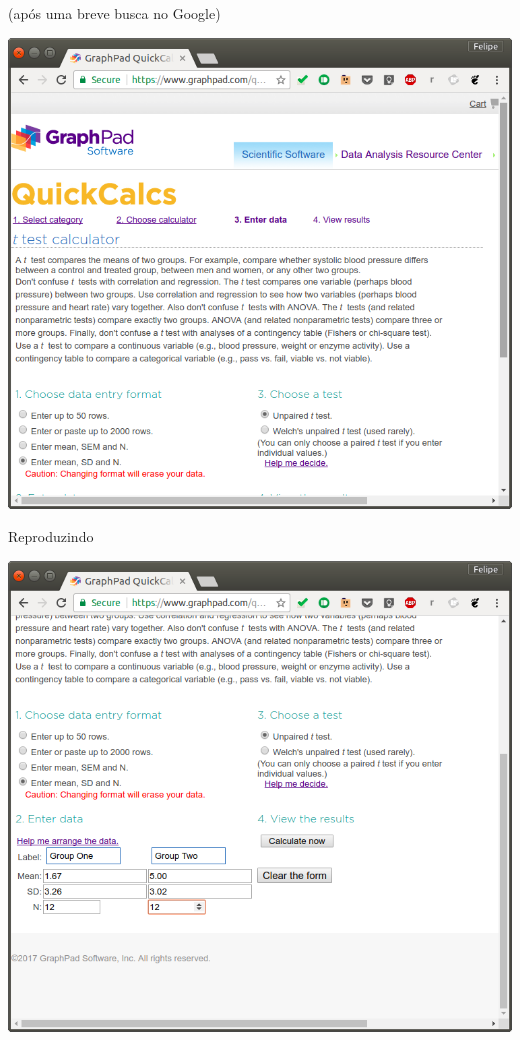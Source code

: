 \documentclass{beamer}
\begin{document}
\begin{frame}{(após uma breve busca no Google)}
  \begin{center}
    \includegraphics[height=.9\textheight]{figuras/teste-t1}
  \end{center}  
\end{frame}

\begin{frame}{Reproduzindo}
  \begin{center}
    \includegraphics[height=.9\textheight]{figuras/teste-t2}
  \end{center}  
\end{frame}
\end{document}
